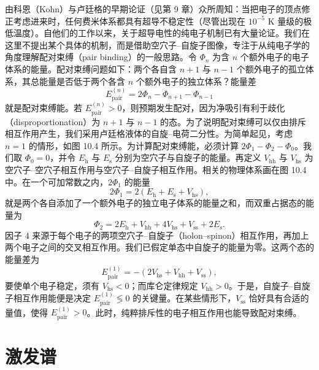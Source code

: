 由科恩（Kohn）与卢廷格的早期论证（见第 9 章）众所周知：当把电子的顶点修正考虑进来时，任何费米体系都具有超导不稳定性（尽管出现在 $10^{-5}$ K 量级的极低温度）。自他们的工作以来，关于超导电性的纯电子机制已有大量论证。我们在这里不提出某个具体的机制，而是借助空穴子–自旋子图像，专注于从纯电子学的角度理解配对束缚（pair binding）的一般思路。令 $\Phi_{n}$ 为含 $n$ 个额外电子的电子体系的能量。配对束缚问题如下：两个各自含 $n+1$ 与 $n-1$ 个额外电子的孤立体系，其总能量是否低于两个各含 $n$ 个额外电子的独立体系？能量差
\begin{equation*}
E_{\mathrm{pair}}^{(n)}=2\Phi_{n}-\Phi_{n+1}-\Phi_{n-1}
\tag{10.65}
\end{equation*}
就是配对束缚能。若 $E_{\mathrm{pair}}^{(n)}>0$，则预期发生配对，因为净吸引有利于歧化（disproportionation）为 $n+1$ 与 $n-1$ 的态。为了说明配对束缚可以仅由排斥相互作用产生，我们采用卢廷格液体的自旋–电荷二分性。为简单起见，考虑 $n=1$ 的情形，如图 10.4 所示。为计算配对束缚能，必须计算 $2\Phi_{1}-\Phi_{2}-\Phi_{0}$。我们取 $\Phi_{0}=0$，并令 $E_{\mathrm{h}}$ 与 $E_{\mathrm{s}}$ 分别为空穴子与自旋子的能量。再定义 $V_{\mathrm{hh}}$ 与 $V_{\mathrm{hs}}$ 为空穴子–空穴子相互作用与空穴子–自旋子相互作用。相关的物理体系画在图 10.4 中。在一个可加常数之内，$2\Phi_{1}$ 的能量
\begin{equation*}
2\Phi_{1}=2\left(E_{\mathrm{h}}+E_{\mathrm{s}}+V_{\mathrm{hs}}\right),
\tag{10.66}
\end{equation*}
就是两个各自添加了一个额外电子的独立电子体系的能量之和，而双重占据态的能量为
\begin{equation*}
\Phi_{2}=2E_{\mathrm{h}}+V_{\mathrm{hh}}+4V_{\mathrm{hs}}+V_{\mathrm{ss}}+2E_{\mathrm{s}}.
\tag{10.67}
\end{equation*}
因子 4 来源于每个电子的两项空穴子–自旋子（holon–spinon）相互作用，再加上两个电子之间的交叉相互作用。我们已假定单态中自旋子的能量为零。这两个态的能量差为
\begin{equation*}
E_{\mathrm{pair}}^{(1)}=-\left(2V_{\mathrm{hs}}+V_{\mathrm{hh}}+V_{\mathrm{ss}}\right),
\tag{10.68}
\end{equation*}
要使单个电子稳定，须有 $V_{\mathrm{hs}}<0$；而库仑定律规定 $V_{\mathrm{hh}}>0$。于是，自旋子–自旋子相互作用能便是决定 $E_{\mathrm{pair}}^{(1)}\lessgtr 0$ 的关键量。在某些情形下，$V_{\mathrm{ss}}$ 恰好具有合适的量值，使得 $E_{\mathrm{pair}}^{(1)}>0$。此时，纯粹排斥性的电子相互作用也能导致配对束缚。

\section{激发谱}

